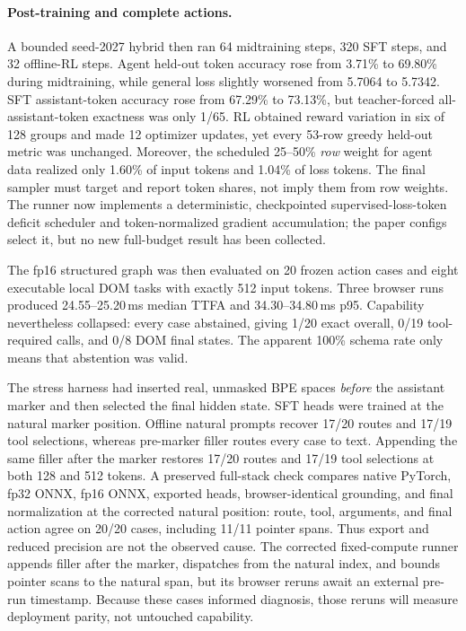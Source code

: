 \documentclass{article}
\begin{document}
\paragraph{Post-training and complete actions.}
A bounded seed-2027 hybrid then ran 64 midtraining steps, 320 SFT steps, and 32 offline-RL steps.
Agent held-out token accuracy rose from 3.71\% to 69.80\% during midtraining, while general loss
slightly worsened from 5.7064 to 5.7342.  SFT assistant-token accuracy rose from 67.29\% to
73.13\%, but teacher-forced all-assistant-token exactness was only 1/65.  RL obtained reward
variation in six of 128 groups and made 12 optimizer updates, yet every 53-row greedy held-out
metric was unchanged.  Moreover, the scheduled 25--50\% \emph{row} weight for agent data realized
only 1.60\% of input tokens and 1.04\% of loss tokens.  The final sampler must target and report
token shares, not imply them from row weights.  The runner now implements a deterministic,
checkpointed supervised-loss-token deficit scheduler and token-normalized gradient accumulation;
the paper configs select it, but no new full-budget result has been collected.

The fp16 structured graph was then evaluated on 20 frozen action cases and eight executable local
DOM tasks with exactly 512 input tokens.  Three browser runs produced 24.55--25.20\,ms median TTFA
and 34.30--34.80\,ms p95.  Capability nevertheless collapsed: every case abstained, giving 1/20
exact overall, 0/19 tool-required calls, and 0/8 DOM final states.  The apparent 100\% schema rate
only means that abstention was valid.

The stress harness had inserted real, unmasked BPE spaces \emph{before} the assistant marker and
then selected the final hidden state.  SFT heads were trained at the natural marker position.
Offline natural prompts recover 17/20 routes and 17/19 tool selections, whereas pre-marker filler
routes every case to text.  Appending the same filler after the marker restores 17/20 routes and
17/19 tool selections at both 128 and 512 tokens.  A preserved full-stack check compares native
PyTorch, fp32 ONNX, fp16 ONNX, exported heads, browser-identical grounding, and final normalization
at the corrected natural position: route, tool, arguments, and final action agree on 20/20 cases,
including 11/11 pointer spans.  Thus export and reduced precision are not the observed cause.  The
corrected fixed-compute runner appends filler after the marker, dispatches from the natural index,
and bounds pointer scans to the natural span, but its browser reruns await an external pre-run
timestamp.  Because these cases informed diagnosis, those reruns will measure deployment parity,
not untouched capability.
\end{document}
